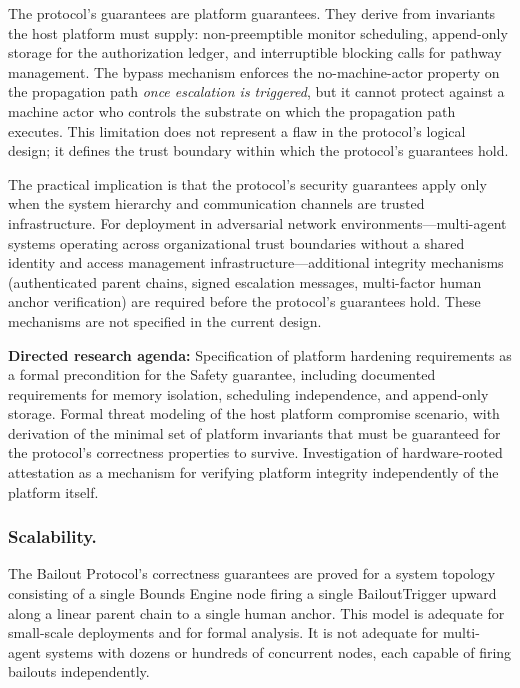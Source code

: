 The protocol's guarantees are platform guarantees. They derive from invariants the host platform must supply: non-preemptible monitor scheduling, append-only storage for the authorization ledger, and interruptible blocking calls for pathway management. The bypass mechanism enforces the no-machine-actor property on the propagation path \emph{once escalation is triggered}, but it cannot protect against a machine actor who controls the substrate on which the propagation path executes. This limitation does not represent a flaw in the protocol's logical design; it defines the trust boundary within which the protocol's guarantees hold.

The practical implication is that the protocol's security guarantees apply only when the system hierarchy and communication channels are trusted infrastructure. For deployment in adversarial network environments---multi-agent systems operating across organizational trust boundaries without a shared identity and access management infrastructure---additional integrity mechanisms (authenticated parent chains, signed escalation messages, multi-factor human anchor verification) are required before the protocol's guarantees hold. These mechanisms are not specified in the current design.

\textbf{Directed research agenda:} Specification of platform hardening requirements as a formal precondition for the Safety guarantee, including documented requirements for memory isolation, scheduling independence, and append-only storage. Formal threat modeling of the host platform compromise scenario, with derivation of the minimal set of platform invariants that must be guaranteed for the protocol's correctness properties to survive. Investigation of hardware-rooted attestation as a mechanism for verifying platform integrity independently of the platform itself.

\subsubsection{Scalability.}
\label{sec:scalability-limitations}

The Bailout Protocol's correctness guarantees are proved for a system topology consisting of a single Bounds Engine node firing a single BailoutTrigger upward along a linear parent chain to a single human anchor. This model is adequate for small-scale deployments and for formal analysis. It is not adequate for multi-agent systems with dozens or hundreds of concurrent nodes, each capable of firing bailouts independently.

